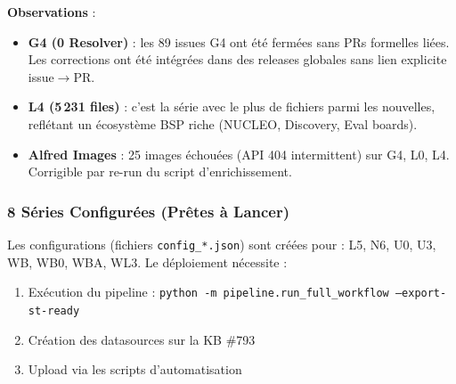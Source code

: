 \textbf{Observations} :
\begin{itemize}
  \item \textbf{G4 (0 Resolver)} : les 89 issues G4 ont été fermées sans PRs formelles liées. Les corrections ont été intégrées dans des releases globales sans lien explicite issue$\to$PR.
  \item \textbf{L4 (5\,231 files)} : c'est la série avec le plus de fichiers parmi les nouvelles, reflétant un écosystème BSP riche (NUCLEO, Discovery, Eval boards).
  \item \textbf{Alfred Images} : 25 images échouées (API 404 intermittent) sur G4, L0, L4. Corrigible par re-run du script d'enrichissement.
\end{itemize}

\subsubsection{8 Séries Configurées (Prêtes à Lancer)}

Les configurations (fichiers \texttt{config\_*.json}) sont créées pour : L5, N6, U0, U3, WB, WB0, WBA, WL3. Le déploiement nécessite :
\begin{enumerate}
  \item Exécution du pipeline : \texttt{python -m pipeline.run\_full\_workflow --export-st-ready}
  \item Création des datasources sur la KB \#793
  \item Upload via les scripts d'automatisation
\end{enumerate}
